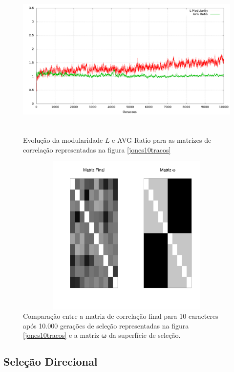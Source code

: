 \begin{figure}[htbp]
    \centering
    \includegraphics[width=150mm, height=80mm]{figuras/jones10tracosStats.png}
    \caption{Evolução da modularidade $L$ e AVG-Ratio para as matrizes de
    correlação representadas na figura \ref{jones10tracos}}
    \label{jones10tracosStats}
\end{figure}



\begin{figure}[htbp]
    \centering
    \includegraphics[width=150mm, height=80mm]{figuras/Mat10tracos}
    \caption{Comparação entre a matriz de correlação final para 10
        caracteres após 10.000 gerações de seleção representadas na figura
    \ref{jones10tracos} e a matriz $\pmb{\omega}$ da superfície de seleção.}
    \label{MatJones10tracos}
\end{figure}



\subsection{Seleção Direcional}

